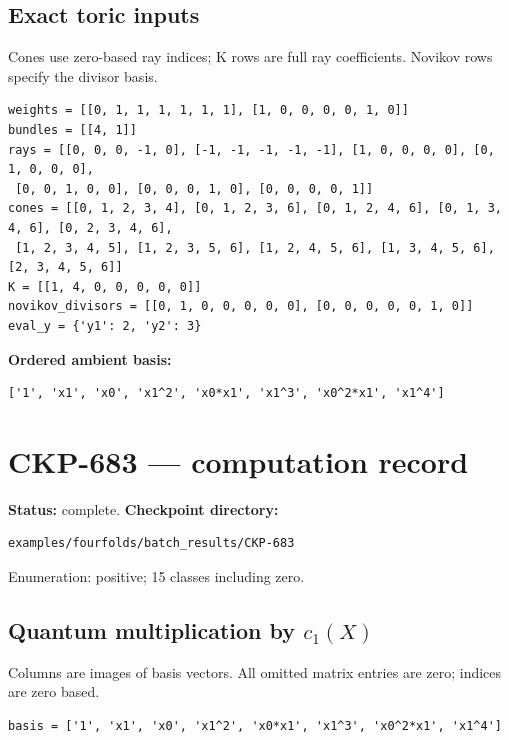 \documentclass[10pt,a4paper]{article}
\begin{document}
\subsection*{Exact toric inputs}
Cones use zero-based ray indices; K rows are full ray coefficients. Novikov rows specify the divisor basis.

\begin{lstlisting}
weights = [[0, 1, 1, 1, 1, 1, 1], [1, 0, 0, 0, 0, 1, 0]]
bundles = [[4, 1]]
rays = [[0, 0, 0, -1, 0], [-1, -1, -1, -1, -1], [1, 0, 0, 0, 0], [0, 1, 0, 0, 0],
 [0, 0, 1, 0, 0], [0, 0, 0, 1, 0], [0, 0, 0, 0, 1]]
cones = [[0, 1, 2, 3, 4], [0, 1, 2, 3, 6], [0, 1, 2, 4, 6], [0, 1, 3, 4, 6], [0, 2, 3, 4, 6],
 [1, 2, 3, 4, 5], [1, 2, 3, 5, 6], [1, 2, 4, 5, 6], [1, 3, 4, 5, 6], [2, 3, 4, 5, 6]]
K = [[1, 4, 0, 0, 0, 0, 0]]
novikov_divisors = [[0, 1, 0, 0, 0, 0, 0], [0, 0, 0, 0, 0, 1, 0]]
eval_y = {'y1': 2, 'y2': 3}
\end{lstlisting}

\textbf{Ordered ambient basis:}
\begin{lstlisting}
['1', 'x1', 'x0', 'x1^2', 'x0*x1', 'x1^3', 'x0^2*x1', 'x1^4']
\end{lstlisting}

\clearpage\section*{CKP-683 --- computation record}
\textbf{Status:} complete.
\textbf{Checkpoint directory:}
\begin{lstlisting}
examples/fourfolds/batch_results/CKP-683
\end{lstlisting}

Enumeration: positive; 15 classes including zero.
\subsection*{Quantum multiplication by $c_1(X)$}
Columns are images of basis vectors. All omitted matrix entries are zero; indices are zero based.

\begin{lstlisting}
basis = ['1', 'x1', 'x0', 'x1^2', 'x0*x1', 'x1^3', 'x0^2*x1', 'x1^4']
\end{lstlisting}
\end{document}
